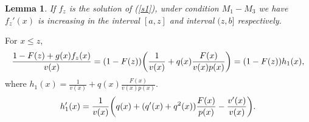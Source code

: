 \documentclass[a4paper,11pt,draft]{article}
\makeatletter
\numberwithin{equation}{section}
\theoremstyle{plain}
\newtheorem{lemma}[theorem]{Lemma}
\theoremstyle{definition}
\theoremstyle{remark}
\let\original@left\left
\let\original@right\right
\renewcommand{\left}{\mathopen{}\mathclose\bgroup\original@left}
\renewcommand{\right}{\aftergroup\egroup\original@right}
\renewcommand{\leq}{\leqslant}
\makeatother
\begin{document}
\begin{lemma}\label{lem4}
	If $f_{z}$ is the solution of (\ref{s1}), under condition $M_{1}-M_{3}$ we
	have $f_z'(x)$ is increasing in the interval $[a,z]$ and interval $(z,b]$ respectively.
\end{lemma}
\proof
\indent For $x\leq z$,
\begin{equation}\label{p2}
\begin{aligned}
	\frac{1-F(z)+g(x)f_{z}(x)}{v(x)}=(1-F(z))\left(
	\frac{1}{v(x)}+q(x)\frac{F(x)}{v(x)p(x)}\right)=(1-F(z)) h_1(x),
\end{aligned}
\end{equation}
where $h_1(x) = \frac{1}{v(x)}+q(x)\frac{F(x)}{v(x)p(x)}$.
\begin{equation}\label{p3}
\begin{aligned}
	h_1'(x)=\frac{1}{v(x)}\left( q(x)+(q'(x)+q^2(x))\frac{F(x)}{p(x)}-\frac{v'(x)}{v(x)}\right). 
\end{aligned}
\end{equation}
\end{document}
